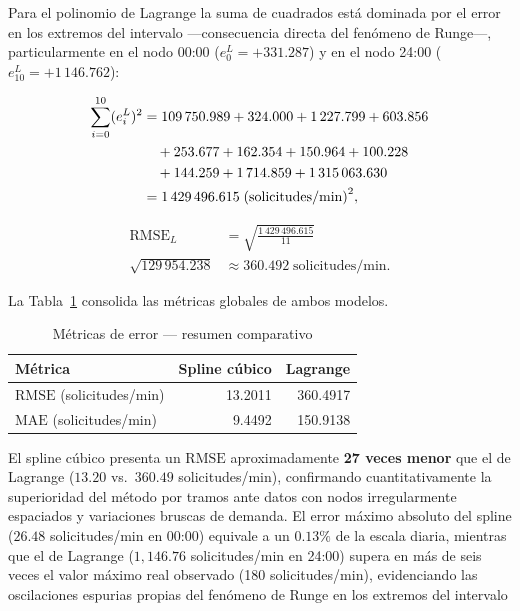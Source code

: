 \documentclass[conference]{IEEEtran}
\begin{document}
Para el polinomio de Lagrange la suma de cuadrados está dominada por el error en los extremos del intervalo —consecuencia directa del fenómeno de Runge—,
particularmente en el nodo 00:00 ($e_0^L = +331.287$) y en el nodo 24:00 ($e_{10}^L = +1\,146.762$):

\begin{align}
\sum_{i=0}^{10} (e_i^{L})^2
  &= 109\,750.989 + 324.000 + 1\,227.799 + 603.856 \notag\\
  &\quad + 253.677 + 162.354 + 150.964 + 100.228 \notag\\
  &\quad + 144.259 + 1\,714.859 + 1\,315\,063.630 \notag\\
  &= 1\,429\,496.615 \; \text{(solicitudes/min)}^2,
\label{eq:suma_cuadrados_lagrange}
\end{align}

\begin{align}
\mathrm{RMSE}_{L}
  &= \sqrt{\frac{1\,429\,496.615}{11}} \\
  \sqrt{129\,954.238} & \approx \mathbf{360.492} \; \text{solicitudes/min}.
\label{eq:rmse_lagrange_final}
\end{align}

La Tabla~\ref{tab:metricas} consolida las métricas globales de ambos modelos.

\begin{table}[h]
\caption{Métricas de error — resumen comparativo}
\label{tab:metricas}
\centering
\begin{tabular}{lrr}
\toprule
\textbf{Métrica} & \textbf{Spline cúbico} & \textbf{Lagrange} \\
\midrule
$\mathrm{RMSE}$ (solicitudes/min) & 13.2011 & 360.4917 \\
$\mathrm{MAE}$  (solicitudes/min) &  9.4492 & 150.9138 \\
\bottomrule
\end{tabular}
\end{table}

El spline cúbico presenta un $\mathrm{RMSE}$ aproximadamente \textbf{27 veces menor} que el de Lagrange ($13.20$ vs.\
$360.49$ solicitudes/min), confirmando cuantitativamente la superioridad del método por tramos ante datos con nodos
irregularmente espaciados y variaciones bruscas de demanda. El error máximo absoluto del spline ($26.48$ solicitudes/min
en 00:00) equivale a un $0.13\%$ de la escala diaria, mientras que el de Lagrange ($1,146.76$ solicitudes/min en 24:00)
supera en más de seis veces el valor máximo real observado (180 solicitudes/min), evidenciando las oscilaciones espurias
propias del fenómeno de Runge en los extremos del intervalo
\end{document}
